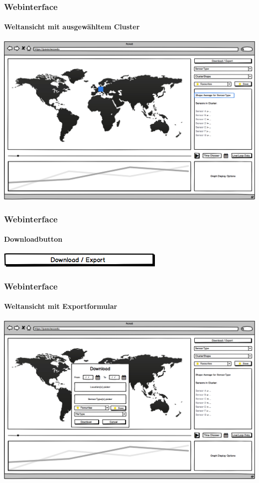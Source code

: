 \documentclass{beamer}
\begin{document}
\begin{frame}
	\frametitle{Webinterface}
	\framesubtitle{Weltansicht mit ausgewähltem Cluster}
	\centering
	\includegraphics[width=\linewidth]{gui/frontend/FrontGUIWorldWithShapeSelection}
\end{frame}

\begin{frame}
	\frametitle{Webinterface}
	\framesubtitle{Downloadbutton}
	\centering
	\includegraphics[width=0.5\linewidth]{gui/frontend/FrontGUIDownloadbutton}
\end{frame}

\begin{frame}
	\frametitle{Webinterface}
	\framesubtitle{Weltansicht mit Exportformular}
	\centering
	\includegraphics[width=\linewidth]{gui/frontend/FrontGUIWorldWithExportForm}
\end{frame}
\end{document}
